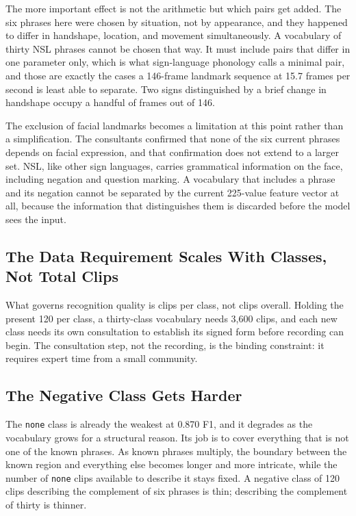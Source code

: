 The more important effect is not the arithmetic but which pairs get added. The six phrases
here were chosen by situation, not by appearance, and they happened to differ in handshape,
location, and movement simultaneously. A vocabulary of thirty NSL phrases cannot be chosen
that way. It must include pairs that differ in one parameter only, which is what
sign-language phonology calls a minimal pair, and those are exactly the cases a
146-frame landmark sequence at 15.7 frames per second is least able to separate. Two signs
distinguished by a brief change in handshape occupy a handful of frames out of 146.

The exclusion of facial landmarks becomes a limitation at this point rather than a
simplification. The consultants confirmed that none of the six current phrases depends on
facial expression, and that confirmation does not extend to a larger set. NSL, like other
sign languages, carries grammatical information on the face, including negation and
question marking. A vocabulary that includes a phrase and its negation cannot be separated
by the current 225-value feature vector at all, because the information that distinguishes
them is discarded before the model sees the input.

\subsection{The Data Requirement Scales With Classes, Not Total Clips}

What governs recognition quality is clips per class, not clips overall. Holding the present
120 per class, a thirty-class vocabulary needs 3{,}600 clips, and each new class needs its
own consultation to establish its signed form before recording can begin. The consultation
step, not the recording, is the binding constraint: it requires expert time from a small
community.

\subsection{The Negative Class Gets Harder}

The \texttt{none} class is already the weakest at 0.870 F1, and it degrades as the
vocabulary grows for a structural reason. Its job is to cover everything that is not one of
the known phrases. As known phrases multiply, the boundary between the known region and
everything else becomes longer and more intricate, while the number of \texttt{none} clips
available to describe it stays fixed. A negative class of 120 clips describing the
complement of six phrases is thin; describing the complement of thirty is thinner.

